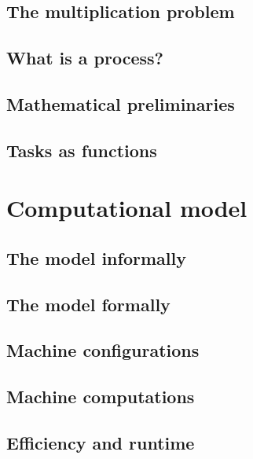 \documentclass[12pt,a4paper,oneside]{book}
\begin{document}
\section{The multiplication problem}

\label{s_1_2}

\section{What is a process?}

\label{s_1_3}

\section{Mathematical preliminaries}

\label{s_1_4}

\section{Tasks as functions}

\label{s_1_5}

\chapter{Computational model}

\label{c_2}

\section{The model informally}

\label{s_2_1}

\section{The model formally}

\label{s_2_2}

\section{Machine configurations}

\label{s_2_3}

\section{Machine computations}

\label{s_2_4}

\section{Efficiency and runtime}

\label{s_2_5}
\end{document}
